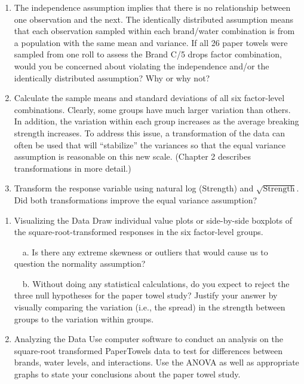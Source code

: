 \documentclass[
]{report}
\begin{document}
\begin{enumerate}
\def\labelenumi{\alph{enumi}.}
\item
  The independence assumption implies that there is no relationship between one observation and the next. The identically distributed assumption means that each observation sampled within each brand/water combination is from a population with the same mean and variance. If all 26 paper towels were sampled from one roll to assess the Brand C/5 drops factor combination, would you be concerned about violating the independence and/or the identically distributed assumption? Why or why not?
\item
  Calculate the sample means and standard deviations of all six factor-level combinations. Clearly, some groups have much larger variation than others. In addition, the variation within each group increases as the average breaking strength increases. To address this issue, a transformation of the data can often be used that will ``stabilize'' the variances so that the equal variance assumption is reasonable on this new scale. (Chapter 2 describes transformations in more detail.)
\item
  Transform the response variable using natural log (Strength) and \(\sqrt{\text{Strength}}\). Did both transformations improve the equal variance assumption?
\end{enumerate}

\begin{enumerate}
\def\labelenumi{\arabic{enumi}.}
\setcounter{enumi}{34}
\item
  Visualizing the Data Draw individual value plots or side-by-side boxplots of the square-root-transformed responses in the six factor-level groups.\\
  \strut ~~a. Is there any extreme skewness or outliers that would cause us to question the normality assumption?\\
  \strut ~~b. Without doing any statistical calculations, do you expect to reject the three null hypotheses for the paper towel study? Justify your answer by visually comparing the variation (i.e., the spread) in the strength between groups to the variation within groups.
\item
  Analyzing the Data Use computer software to conduct an analysis on the square-root transformed PaperTowels data to test for differences between brands, water levels, and interactions. Use the ANOVA as well as appropriate graphs to state your conclusions about the paper towel study.
\end{enumerate}
\end{document}
